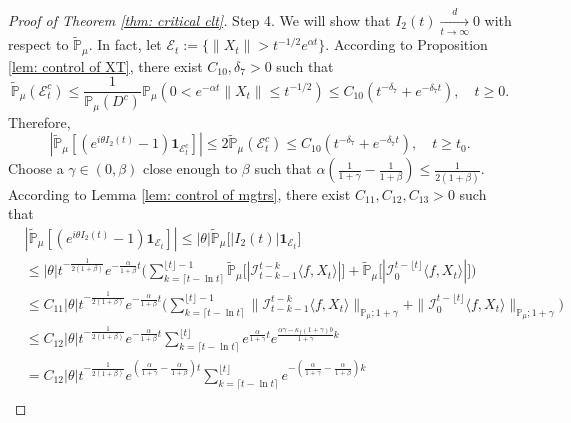 \documentclass[12pt,a4paper]{amsart}
\theoremstyle{plain}
\theoremstyle{definition}
\numberwithin{equation}{section}
\begin{document}
\begin{proof}[Proof of Theorem \ref{thm: critical clt}]
    Step 4.
    We will show that $I_2(t) \xrightarrow[t\to \infty]{d} 0$ with respect to $\mathbb{\tilde{P}}_{\mu}$.
    In fact, let $\mathcal{E}_t:=\{\|X_t\|>t^{-1/2}e^{\alpha t}\}$. According to Proposition \ref{lem: control of XT}, there exist $C_{10}, \delta_7>0$ such that
\begin{equation}
    \mathbb{\tilde{P}}_{\mu}(\mathcal{E}^c_t)\leq \frac{1}{\mathbb{P}_{\mu}(D^c)}\mathbb{P}_{\mu}(0<e^{-\alpha t}\|X_t\|\leq t^{-1/2})\leq C_{10}( t^{-\delta_7}+e^{-\delta_7 t}), \quad t\geq0.
\end{equation}
    Therefore, 
\begin{equation}\label{Theorem123}
    |\mathbb{\tilde{P}}_{\mu}[(e^{i\theta I_2(t)}-1)\mathbf{1}_{\mathcal{E}^c_t}]|
    \leq 2\mathbb{\tilde{P}}_{\mu}(\mathcal{E}^c_t)\leq C_{10}(t^{-\delta_7}+e^{-\delta_7 t}),
    \quad t\geq t_0.
\end{equation}
    Choose a $\gamma\in (0,\beta)$ close enough to $\beta$ such that $\alpha(\frac{1}{1+\gamma}-\frac{1}{1+\beta})\leq \frac{1}{2(1+\beta)}$.
	According to Lemma \ref{lem: control of mgtrs}, there exist $C_{11},C_{12},C_{13}>0$ such that
\begin{align}
    &|\mathbb{\tilde{P}}_{\mu} [ (e^{i\theta I_2(t)}-1)\mathbf{1}_{\mathcal{E}_t}]|
    \leq |\theta| \mathbb{\tilde{P}}_{\mu} \big[ |I_2(t)|\mathbf{1}_{\mathcal{E}_t}\big]
    \\&\leq|\theta| t^{-\frac{1}{2(1+\beta)}}e^{-\frac{\alpha}{1+\beta}t}\Big(\sum_{k=\lceil t-\ln t \rceil}^{\lfloor t \rfloor - 1}\mathbb{\tilde{P}}_{\mu}\big[| \mathcal{I}_{t-k-1}^{t-k}\langle f,X_t\rangle|\big] + \mathbb{\tilde{P}}_{\mu}\big[| \mathcal{I}_{0}^{t-\lfloor t\rfloor}\langle f,X_t\rangle|\big]\Big)
    \\& \leq C_{11} |\theta| t^{-\frac{1}{2(1+\beta)}}e^{-\frac{\alpha}{1+\beta}t}\Big(\sum_{k=\lceil t-\ln t \rceil}^{\lfloor t \rfloor - 1}\|\mathcal{I}_{t-k-1}^{t-k}\langle f,X_t\rangle\|_{\mathbb P_\mu; 1+\gamma} + \|\mathcal I_0^{t-\lfloor t \rfloor} \langle f, X_t\rangle\|_{\mathbb P_\mu;1+\gamma}\Big)
    \\ &\leq C_{12} |\theta| t^{-\frac{1}{2(1+\beta)}}e^{-\frac{\alpha}{1+\beta}t}\sum_{k=\lceil t-\ln t \rceil}^{\lfloor t \rfloor}e^{\frac{\alpha}{1+\gamma}t}e^{\frac{\alpha\gamma-\kappa_f(1+\gamma)b}{1+\gamma}k}\\
    &= C_{12} |\theta| t^{-\frac{1}{2(1+\beta)}}e^{(\frac{\alpha }{1+\gamma}-\frac{\alpha }{1+\beta})t} \sum_{k=\lceil t-\ln t \rceil}^{\lfloor t \rfloor}e^{-(\frac{\alpha}{1+\gamma}-\frac{\alpha}{1+\beta})k}\\

\end{align}
\end{proof}
\end{document}
